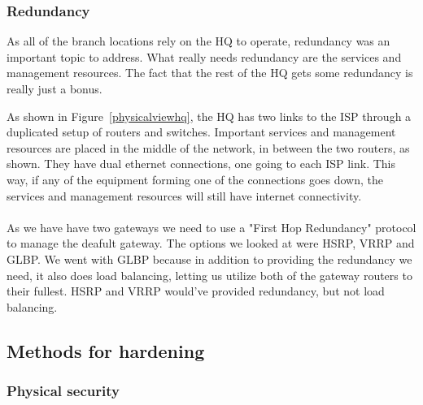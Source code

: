 
\subsubsection{Redundancy}

As all of the branch locations rely on the HQ to operate, redundancy was an important topic to address. What really needs redundancy are the services and management resources. The fact that the rest of the HQ gets some redundancy is really just a bonus.

As shown in Figure~\ref{physicalviewhq}, the HQ has two links to the ISP through a duplicated setup of routers and switches. Important services and management resources are placed in the middle of the network, in between the two routers, as shown. They have dual ethernet connections, one going to each ISP link. This way, if any of the equipment forming one of the connections goes down, the services and management resources will still have internet connectivity.
\\
\\
As we have have two gateways we need to use a "First Hop Redundancy" protocol to manage the deafult gateway. The options we looked at were HSRP, VRRP and GLBP. We went with GLBP because in addition to providing the redundancy we need, it also does load balancing, letting us utilize both of the gateway routers to their fullest. HSRP and VRRP would've provided redundancy, but not load balancing.




\subsection{Methods for hardening}

\subsubsection{Physical security}


